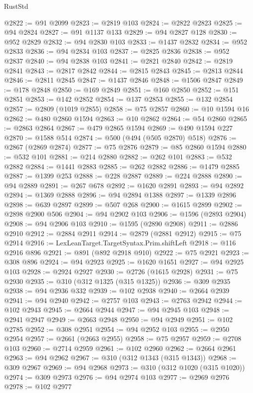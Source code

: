 \begin{lexlean}{RustStd}
\begin{coremodule}
@2822 := @91 @2099
@2823 := @2819 @103
@2824 := @2822 @2823
@2825 := @94 @2824
@2827 := @91 @1137 @133
@2829 := @94 @2827 @128
@2830 := @952 @2829
@2832 := @94 @2830 @103
@2833 := @1437 @2832
@2834 := @952 @2833
@2836 := @94 @2834 @103
@2837 := @2825 @2836
@2838 := @952 @2837
@2840 := @94 @2838 @103
@2841 := @2821 @2840
@2842 := @2819 @2841
@2843 := @2817 @2842
@2844 := @2815 @2843
@2845 := @2813 @2844
@2846 := @2811 @2845
@2847 := @1437 @2846
@2848 := @1506 @2847
@2849 := @178 @2848
@2850 := @169 @2849
@2851 := @160 @2850
@2852 := @151 @2851
@2853 := @142 @2852
@2854 := @137 @2853
@2855 := @132 @2854
@2857 := @2809 (@1019 @2855)
@2858 := @75 @2857
@2860 := @10 @1594 @16
@2862 := @480 @2860 @1594
@2863 := @10 @2862
@2864 := @54 @2860
@2865 := @2863 @2864
@2867 := @479 @2865 @1594
@2869 := @490 @1594 @227
@2870 := @1588 @514
@2874 := @500 (@494 (@505 @2870) @518)
@2876 := @2867 (@2869 @2874)
@2877 := @75 @2876
@2879 := @85 @2860 @1594
@2880 := @532 @101
@2881 := @214 @2880
@2882 := @262 @101
@2883 := @532 @2882
@2884 := @1441 @2883
@2885 := @262 @2882
@2886 := @1479 @2885
@2887 := @1399 @253
@2888 := @228 @2887
@2889 := @224 @2888
@2890 := @94 @2889
@2891 := @267 @678
@2892 := @1620 @2891
@2893 := @94 @2892
@2894 := @1369 @2888
@2896 := @94 @2894 @1388
@2897 := @1339 @2896
@2898 := @639 @2897
@2899 := @507 @268
@2900 := @1615 @2899
@2902 := @2898 @2900 @506
@2904 := @94 @2902 @103
@2906 := @1596 (@2893 @2904)
@2908 := @94 @2906 @103
@2910 := @1595 (@2890 @2908)
@2911 := @2886 @2910
@2912 := @2884 @2911
@2914 := @2879 (@2881 @2912)
@2915 := @75 @2914
@2916 := LexLeanTarget.TargetSyntax.Prim.shiftLeft
@2918 := @116 @2916 @896
@2921 := @891 (@892 @2918 @910)
@2922 := @75 @2921
@2923 := @308 @896
@2924 := @94 @2923
@2925 := @1620 @1651
@2927 := @94 @2925 @103
@2928 := @2924 @2927
@2930 := @2726 (@1615 @2928)
@2931 := @75 @2930
@2935 := @310 (@312 @1325 (@315 @1325))
@2936 := @309 @2935
@2938 := @94 @2936 @332
@2939 := @102 @2938
@2940 := @2664 @2939
@2941 := @94 @2940
@2942 := @2757 @103
@2943 := @2763 @2942
@2944 := @102 @2943
@2945 := @2664 @2944
@2947 := @94 @2945 @103
@2948 := @2941 @2947
@2949 := @2663 @2948
@2950 := @94 @2949
@2951 := @102 @2785
@2952 := @308 @2951
@2954 := @94 @2952 @103
@2955 := @2950 @2954
@2957 := @2661 (@2663 @2955)
@2958 := @75 @2957
@2959 := @2708 @103
@2960 := @2714 @2959
@2961 := @102 @2960
@2962 := @2664 @2961
@2963 := @94 @2962
@2967 := @310 (@312 @1343 (@315 @1343))
@2968 := @309 @2967
@2969 := @94 @2968
@2973 := @310 (@312 @1020 (@315 @1020))
@2974 := @309 @2973
@2976 := @94 @2974 @103
@2977 := @2969 @2976
@2978 := @102 @2977

\end{coremodule}
\end{lexlean}

